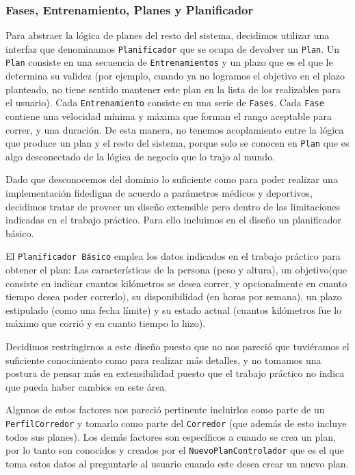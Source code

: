 \documentclass[10pt, a4paper,english,spanish]{article}
\begin{document}
\subsubsection{Fases, Entrenamiento, Planes y Planificador}
Para abstraer la lógica de planes del resto del sistema, decidimos utilizar una interfaz que denominamos \texttt{Planificador} que se ocupa de devolver un \texttt{Plan}. Un \texttt{Plan} consiste en una secuencia de \texttt{Entrenamientos} y un plazo que es el que le determina su validez (por ejemplo, cuando ya no logramos el objetivo en el plazo planteado, no tiene sentido mantener este plan en la lista de los realizables para el usuario). Cada \texttt{Entrenamiento} consiste en una serie de \texttt{Fases}. Cada \texttt{Fase} contiene una velocidad mínima y máxima que forman el rango aceptable para correr, y una duración. De esta manera, no tenemos acoplamiento entre la lógica que produce un plan y el resto del sistema, porque solo se conocen en \texttt{Plan} que es algo desconectado de la lógica de negocio que lo trajo al mundo.

Dado que desconocemos del dominio lo suficiente como para poder realizar una implementación fidedigna de acuerdo a parámetros médicos y deportivos, decidimos tratar de proveer un dise\~no extensible pero dentro de las limitaciones indicadas en el trabajo práctico. Para ello incluimos en el dise\~no un planificador básico.

El \texttt{Planificador Básico} emplea los datos indicados en el trabajo práctico para obtener el plan: Las características de la persona (peso y altura), un objetivo(que consiste en indicar cuantos kilómetros se desea correr, y opcionalmente en cuanto tiempo desea poder correrlo), su disponibilidad (en horas por semana), un plazo estipulado (como una fecha límite) y su estado actual (cuantos kilómetros fue lo máximo que corrió y en cuanto tiempo lo hizo).

Decidimos restringirnos a este diseño puesto que no nos pareció que tuviéramos el suficiente conocimiento como para realizar más detalles, y no tomamos una postura de pensar más en extensibilidad puesto que el trabajo práctico no indica que pueda haber cambios en este área.

Algunos de estos factores nos pareció pertinente incluirlos como parte de un \texttt{PerfilCorredor} y tomarlo como parte del \texttt{Corredor} (que además de esto incluye todos sus planes). Los demás factores son específicos a cuando se crea un plan, por lo tanto son conocidos y creados por el \texttt{NuevoPlanControlador} que es el que toma estos datos al preguntarle al usuario cuando este desea crear un nuevo plan.
\end{document}
